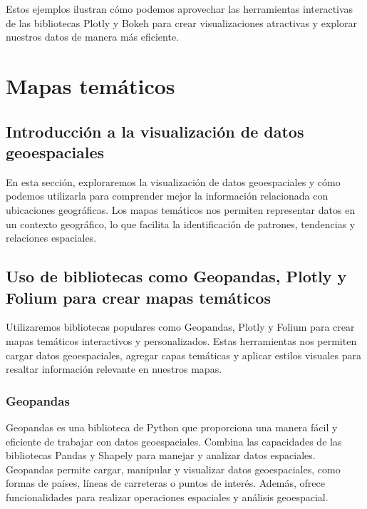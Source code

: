 \documentclass[
  a4paper,
]{article}
\begin{document}
Estos ejemplos ilustran cómo podemos aprovechar las herramientas
interactivas de las bibliotecas Plotly y Bokeh para crear
visualizaciones atractivas y explorar nuestros datos de manera más
eficiente.

\hypertarget{mapas-temuxe1ticos}{%
\section{Mapas temáticos}\label{mapas-temuxe1ticos}}

\hypertarget{introducciuxf3n-a-la-visualizaciuxf3n-de-datos-geoespaciales}{%
\subsection{Introducción a la visualización de datos
geoespaciales}\label{introducciuxf3n-a-la-visualizaciuxf3n-de-datos-geoespaciales}}

En esta sección, exploraremos la visualización de datos geoespaciales y
cómo podemos utilizarla para comprender mejor la información relacionada
con ubicaciones geográficas. Los mapas temáticos nos permiten
representar datos en un contexto geográfico, lo que facilita la
identificación de patrones, tendencias y relaciones espaciales.

\hypertarget{uso-de-bibliotecas-como-geopandas-plotly-y-folium-para-crear-mapas-temuxe1ticos}{%
\subsection{Uso de bibliotecas como Geopandas, Plotly y Folium para
crear mapas
temáticos}\label{uso-de-bibliotecas-como-geopandas-plotly-y-folium-para-crear-mapas-temuxe1ticos}}

Utilizaremos bibliotecas populares como Geopandas, Plotly y Folium para
crear mapas temáticos interactivos y personalizados. Estas herramientas
nos permiten cargar datos geoespaciales, agregar capas temáticas y
aplicar estilos visuales para resaltar información relevante en nuestros
mapas.

\hypertarget{geopandas}{%
\subsubsection{Geopandas}\label{geopandas}}

Geopandas es una biblioteca de Python que proporciona una manera fácil y
eficiente de trabajar con datos geoespaciales. Combina las capacidades
de las bibliotecas Pandas y Shapely para manejar y analizar datos
espaciales. Geopandas permite cargar, manipular y visualizar datos
geoespaciales, como formas de países, líneas de carreteras o puntos de
interés. Además, ofrece funcionalidades para realizar operaciones
espaciales y análisis geoespacial.
\end{document}
